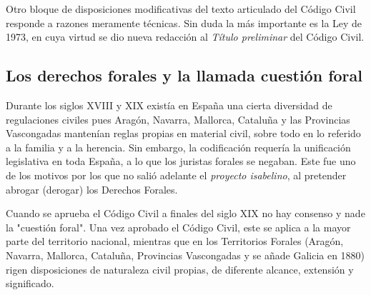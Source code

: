 \documentclass[a4paper,12pt]{report}
\begin{document}
Otro bloque de disposiciones modificativas del texto articulado del Código Civil
responde a razones meramente técnicas. Sin duda la más importante es la Ley de
1973, en cuya virtud se dio nueva redacción al \emph{Título preliminar} del
Código Civil.

\subsection{Los derechos forales y la llamada cuestión foral}

Durante los siglos XVIII y XIX existía en España una cierta diversidad de
regulaciones civiles pues Aragón, Navarra, Mallorca, Cataluña y las Provincias
Vascongadas mantenían reglas propias en material civil, sobre todo en lo
referido a la familia y a la herencia. Sin embargo, la codificación requería la
unificación legislativa en toda España, a lo que los juristas forales se
negaban. Este fue uno de los motivos por los que no salió adelante el
\emph{proyecto isabelino}, al pretender abrogar (derogar) los Derechos Forales.

Cuando se aprueba el Código Civil a finales del siglo XIX no hay consenso y nade
la "cuestión foral". Una vez aprobado el Código Civil, este se aplica a la mayor
parte del territorio nacional, mientras que en los Territorios Forales (Aragón,
Navarra, Mallorca, Cataluña, Provincias Vascongadas y se añade Galicia en 1880)
rigen disposiciones de naturaleza civil propias, de diferente alcance, extensión
y significado.
\end{document}
